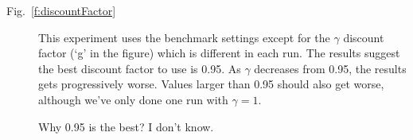 \begin{description}
\item[Fig.~\ref{f:discountFactor}]
This experiment uses the benchmark settings except for the $\gamma$
discount factor (`g' in the figure) which is different in each run.
The results suggest the best discount factor to use is 0.95. As
$\gamma$ decreases from 0.95, the results gets progressively worse.
Values larger than 0.95 should also get worse, although we've only
done one run with $\gamma = 1$.

Why 0.95 is the best? I don't know.

\end{description}